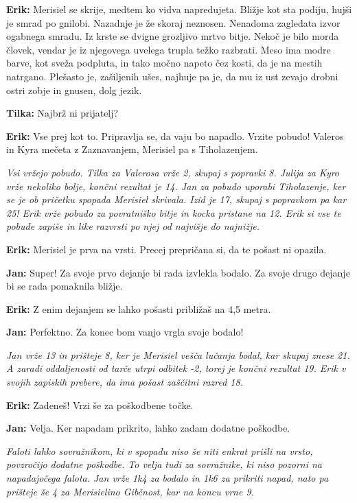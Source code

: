 \textbf{Erik:} Merisiel se skrije, medtem ko vidva napredujeta. Bližje kot sta podiju, hujši je smrad po gnilobi. Nazadnje je že skoraj neznosen. Nenadoma zagledata izvor ogabnega smradu. Iz krste se dvigne grozljivo mrtvo bitje. Nekoč je bilo morda človek, vendar je iz njegovega uvelega trupla težko razbrati. Meso ima modre barve, kot sveža podpluta, in tako močno napeto čez kosti, da je na mestih natrgano. Plešasto je, zašiljenih ušes, najhuje pa je, da mu iz ust zevajo drobni ostri zobje in gnusen, dolg jezik.

\textbf{Tilka:} Najbrž ni prijatelj?

\textbf{Erik:} Vse prej kot to. Pripravlja se, da vaju bo napadlo. Vrzite pobudo! Valeros in Kyra mečeta z Zaznavanjem, Merisiel pa s Tiholazenjem.

\vspace{20pt}
\textit{Vsi vržejo pobudo. Tilka za Valerosa vrže 2, skupaj s popravki 8. Julija za Kyro vrže nekoliko bolje, končni rezultat je 14. Jan za pobudo uporabi Tiholazenje, ker se je ob pričetku spopada Merisiel skrivala. Izid je 17, skupaj s popravkom pa kar 25! Erik vrže pobudo za povratniško bitje in kocka pristane na 12. Erik si vse te pobude zapiše in like razvrsti po njej od najvišje do najnižje.}
\vspace{20pt}

\textbf{Erik:} Merisiel je prva na vrsti. Precej prepričana si, da te pošast ni opazila.

\textbf{Jan:} Super! Za svoje prvo dejanje bi rada izvlekla bodalo. Za svoje drugo dejanje bi se rada pomaknila bližje.

\textbf{Erik:} Z enim dejanjem se lahko pošasti približaš na 4,5 metra.

\textbf{Jan:} Perfektno. Za konec bom vanjo vrgla svoje bodalo!

\vspace{20pt}
\textit{Jan vrže 13 in prišteje 8, ker je Merisiel vešča lučanja bodal, kar skupaj znese 21. A zaradi oddaljenosti od tarče utrpi odbitek -2, torej je končni rezultat 19. Erik v svojih zapiskih prebere, da ima pošast zaščitni razred 18.}
\vspace{20pt}

\textbf{Erik:} Zadeneš! Vrzi še za poškodbene točke.

\textbf{Jan:} Velja. Ker napadam prikrito, lahko zadam dodatne poškodbe.

\vspace{20pt}
\textit{Faloti lahko sovražnikom, ki v spopadu niso še niti enkrat prišli na vrsto, povzročijo dodatne poškodbe. To velja tudi za sovražnike, ki niso pozorni na napadajočega falota. Jan vrže 1k4 za bodalo in 1k6 za prikriti napad, nato pa prišteje še 4 za Merisielino Gibčnost, kar na koncu vrne 9.}
\vspace{20pt}

